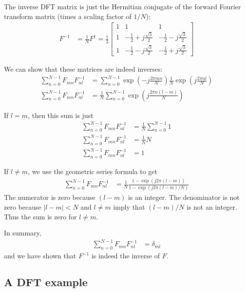 \documentclass[twocolumn]{myarticle}
\newcommand{\mat}[1]{\begin{bmatrix}#1\end{bmatrix}}
\begin{document}
The inverse DFT matrix is just the Hermitian conjugate of the forward Fourier transform matrix (times a scaling factor of $ 1/N $):
\begin{align}
    F^{-1} &= \frac{1}{N} F^{\dagger} = \frac{1}{3} \mat{ 1 & 1 & 1 \\ 1 & -\frac{1}{2} + j \frac{\sqrt{3}}{2} & -\frac{1}{2} - j \frac{\sqrt{3}}{2} \\ 1 & -\frac{1}{2} - j \frac{\sqrt{3}}{2} &-\frac{1}{2} + j \frac{\sqrt{3}}{2} }
\end{align}

We can show that these matrices are indeed inverses:
\begin{align}
    \sum_{n = 0}^{N-1} F_{mn} F^{-1}_{nl} &= \sum_{n = 0}^{N-1} \exp \left( - j \frac{2 \pi m n}{N} \right) \frac{1}{N} \exp \left( j \frac{2 \pi n l}{N} \right)
    \\
    \sum_{n = 0}^{N-1} F_{mn} F^{-1}_{nl} &= \frac{1}{N} \sum_{n = 0}^{N-1} \exp \left( j \frac{2 \pi n (l - m)}{N} \right)
\end{align}

If $ l = m $, then this sum is just 
\begin{align}
    \sum_{n = 0}^{N-1} F_{mn} F^{-1}_{nl} &= \frac{1}{N} \sum_{n = 0}^{N-1} 1
    \\
    \sum_{n = 0}^{N-1} F_{mn} F^{-1}_{nl} &= \frac{1}{N} N
    \\
    \sum_{n = 0}^{N-1} F_{mn} F^{-1}_{nl} &= 1
\end{align}

If $ l \neq m $, we use the geometric series formula to get
\begin{align}
    \sum_{n = 0}^{N-1} F_{mn} F^{-1}_{nl} &= \frac{1}{N} \frac{1 - \exp \left( j 2 \pi (l-m) \right)}{1 - \exp \left( j 2 \pi (l-m)/N \right)}
\end{align}
The numerator is zero because $ (l-m) $ is an integer. 
The denominator is not zero because $ |l - m| < N $ and $ l \neq m $ imply that $ (l-m)/N $ is not an integer.
Thus the sum is zero for $ l \neq m $.

In summary,
\begin{align}
    \sum_{n = 0}^{N-1} F_{mn} F^{-1}_{nl} &= \delta_{ml}
\end{align}
and we have shown that $ F^{-1} $ is indeed the inverse of $ F $.

\subsection{A DFT example}
\label{subsec:a_dft_example}
\end{document}
